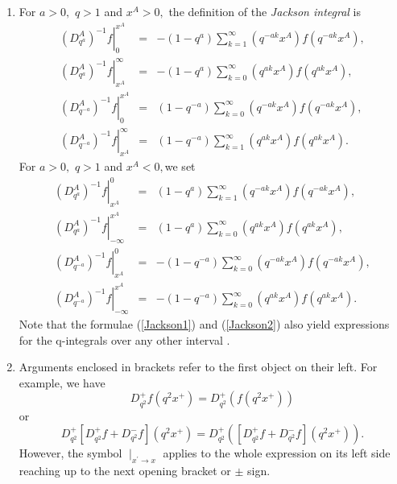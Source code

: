 \documentclass[a4paper,11pt,oneside]{article}
\begin{document}
\begin{enumerate}
\item  For $a>0,$ $q>1$ and $x^{A}>0,$ the definition of the \textit{Jackson
integral }is 
\begin{eqnarray}
\left. \left( D_{q^{a}}^{A}\right) ^{-1}f\right| _{0}^{x^{A}} &=&-\left(
1-q^{a}\right) \sum_{k=1}^{\infty }\left( q^{-ak}x^{A}\right) f\left(
q^{-ak}x^{A}\right) ,  \label{Jackson1} \\
\left. \left( D_{q^{a}}^{A}\right) ^{-1}f\right| _{x^{A}}^{\infty }
&=&-\left( 1-q^{a}\right) \sum_{k=0}^{\infty }\left( q^{ak}x^{A}\right)
f\left( q^{ak}x^{A}\right) ,  \nonumber \\
\left. \left( D_{q^{-a}}^{A}\right) ^{-1}f\right| _{0}^{x^{A}} &=&\left(
1-q^{-a}\right) \sum_{k=0}^{\infty }\left( q^{-ak}x^{A}\right) f\left(
q^{-ak}x^{A}\right) ,  \nonumber \\
\left. \left( D_{q^{-a}}^{A}\right) ^{-1}f\right| _{x^{A}}^{\infty }
&=&\left( 1-q^{-a}\right) \sum_{k=1}^{\infty }\left( q^{ak}x^{A}\right)
f\left( q^{ak}x^{A}\right) .  \nonumber
\end{eqnarray}
For $a>0,$ $q>1$ and $x^{A}<0,$we set 
\begin{eqnarray}
\left. \left( D_{q^{a}}^{A}\right) ^{-1}f\right| _{x^{A}}^{0} &=&\left(
1-q^{a}\right) \sum_{k=1}^{\infty }\left( q^{-ak}x^{A}\right) f\left(
q^{-ak}x^{A}\right) ,  \label{Jackson2} \\
\left. \left( D_{q^{a}}^{A}\right) ^{-1}f\right| _{-\infty }^{x^{A}}
&=&\left( 1-q^{a}\right) \sum_{k=0}^{\infty }\left( q^{ak}x^{A}\right)
f\left( q^{ak}x^{A}\right) ,  \nonumber \\
\left. \left( D_{q^{-a}}^{A}\right) ^{-1}f\right| _{x^{A}}^{0} &=&-\left(
1-q^{-a}\right) \sum_{k=0}^{\infty }\left( q^{-ak}x^{A}\right) f\left(
q^{-ak}x^{A}\right) ,  \nonumber \\
\left. \left( D_{q^{-a}}^{A}\right) ^{-1}f\right| _{-\infty }^{x^{A}}
&=&-\left( 1-q^{-a}\right) \sum_{k=0}^{\infty }\left( q^{ak}x^{A}\right)
f\left( q^{ak}x^{A}\right) .  \nonumber
\end{eqnarray}
Note that the formulae (\ref{Jackson1}) and (\ref{Jackson2}) also yield
expressions for the q-integrals over any other interval \cite{KS97}.

\item  Arguments enclosed in brackets refer to the first object on their
left. For example, we have 
\begin{equation}
D_{q^{2}}^{+}f\left( q^{2}x^{+}\right) =D_{q^{2}}^{+}\left( f\left(
q^{2}x^{+}\right) \right)
\end{equation}
or 
\begin{equation}
D_{q^{2}}^{+}\left[ D_{q^{2}}^{+}f+D_{q^{2}}^{-}f\right] \left(
q^{2}x^{+}\right) =D_{q^{2}}^{+}\left( \left[
D_{q^{2}}^{+}f+D_{q^{2}}^{-}f\right] \left( q^{2}x^{+}\right) \right) .
\end{equation}
However, the symbol $\mid _{x^{\prime }\rightarrow x}$ applies to the whole
expression on its left side reaching up to the next opening bracket or $\pm $
sign.


\end{enumerate}
\end{document}

